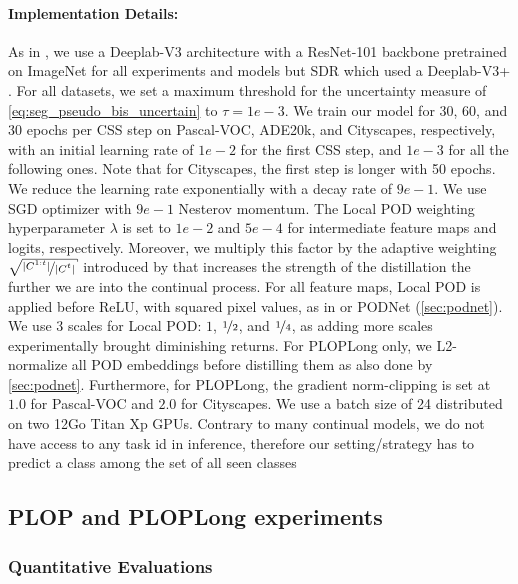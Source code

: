 \paragraph{Implementation Details:} As in \citet{cermelli2020modelingthebackground}, we use a
Deeplab-V3 \citep{chen2017deeplabv3} architecture with a ResNet-101 \citep{he2016resnet} backbone
pretrained on ImageNet \citep{deng2009imagenet} for all experiments and models but SDR
\citep{michieli2021sdr} which used a Deeplab-V3+ \citep{chen2018deeplabv3plus}. For all datasets, we
set a maximum threshold for the uncertainty measure of \autoref{eq:seg_pseudo_bis_uncertain} to
$\tau=1e-3$. We train our model for 30, 60, and 30 epochs per \ac{CSS} step on Pascal-VOC, ADE20k,
and Cityscapes, respectively, with an initial learning rate of $1e-2$ for the first \ac{CSS} step,
and $1e-3$ for all the following ones. Note that for Cityscapes, the first step is longer with 50
epochs. We reduce the learning rate exponentially with a decay rate of $9e-1$. We use SGD optimizer
with $9e-1$ Nesterov momentum. The Local POD weighting hyperparameter $\lambda$ is set to $1e-2$ and
$5e-4$ for intermediate feature maps and logits, respectively. Moreover, we multiply this factor by
the adaptive weighting $\sqrt{\nicefrac{|C^{1:t}|}{|C^{t}|}}$ introduced by \citep{hou2019ucir} that
increases the strength of the distillation the further we are into the continual process. For all
feature maps, Local POD is applied before ReLU, with squared pixel values, as in
\citet{zagoruyko2016distillation_attention} or PODNet (\autoref{sec:podnet}). We use 3 scales for
Local POD: $1$, $\nicefrac{1}{2}$, and $\nicefrac{1}{4}$, as adding more scales experimentally
brought diminishing returns. For PLOPLong only, we L2-normalize all POD embeddings before distilling
them as also done by \autoref{sec:podnet}. Furthermore, for PLOPLong, the gradient norm-clipping is
set at $1.0$ for Pascal-VOC and $2.0$ for Cityscapes. We use a batch size of 24 distributed on two
12Go Titan Xp GPUs. Contrary to many continual models, we do not have access to any task id in
inference, therefore our setting/strategy has to predict a class among the set of all seen classes



\subsection{PLOP and PLOPLong experiments}
\label{sec:seg_plop_exp}

\subsubsection{Quantitative Evaluations}



